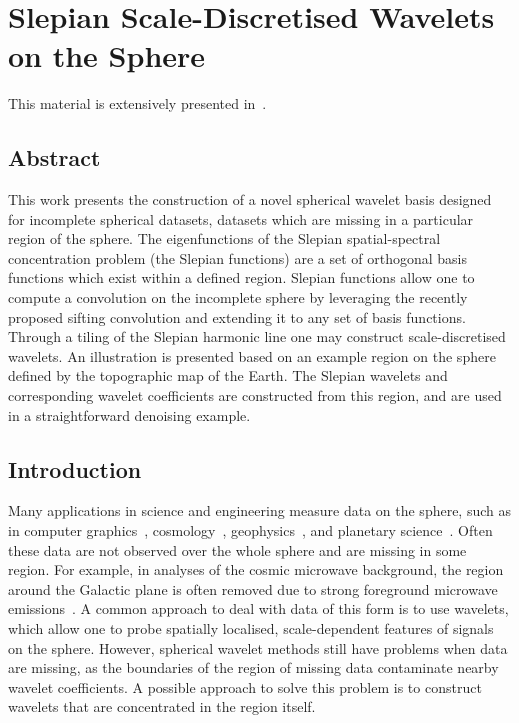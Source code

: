 \chapter{Slepian Scale-Discretised Wavelets on the Sphere}\label{sec:chapter3}

This material is extensively presented in~\cite{Roddy2021a}.

\section*{Abstract}

This work presents the construction of a novel spherical wavelet basis designed for incomplete spherical datasets, \ie{} datasets which are missing in a particular region of the sphere.
The eigenfunctions of the Slepian spatial-spectral concentration problem (the Slepian functions) are a set of orthogonal basis functions which exist within a defined region.
Slepian functions allow one to compute a convolution on the incomplete sphere by leveraging the recently proposed sifting convolution and extending it to any set of basis functions.
Through a tiling of the Slepian harmonic line one may construct scale-discretised wavelets.
An illustration is presented based on an example region on the sphere defined by the topographic map of the Earth.
The Slepian wavelets and corresponding wavelet coefficients are constructed from this region, and are used in a straightforward denoising example.

\section{Introduction}

Many applications in science and engineering measure data on the sphere, such as in computer graphics~\cite{Ramamoorthi2004}, cosmology~\cite{Bennett1996}, geophysics~\cite{Simons2006}, and planetary science~\cite{Turcotte1981}.
Often these data are not observed over the whole sphere and are missing in some region.
For example, in analyses of the cosmic microwave background, the region around the Galactic plane is often removed due to strong foreground microwave emissions~\cite{Mortlock2002}.
A common approach to deal with data of this form is to use wavelets, which allow one to probe spatially localised, scale-dependent features of signals on the sphere.
However, spherical wavelet methods still have problems when data are missing, as the boundaries of the region of missing data contaminate nearby wavelet coefficients.
A possible approach to solve this problem is to construct wavelets that are concentrated in the region itself.

